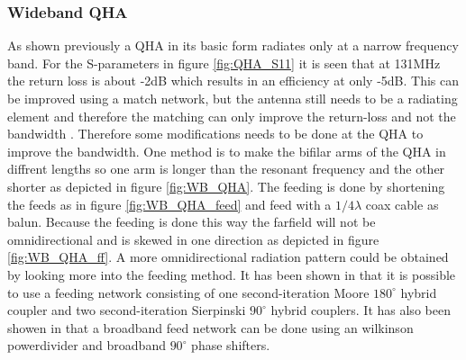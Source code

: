 \subsubsection{Wideband QHA} 
As shown previously a QHA in its basic form radiates only at a narrow frequency band. For the S-parameters in figure \ref{fig:QHA_S11} it is seen that at 131MHz the return loss is about -2dB which results in an efficiency at only -5dB. This can be improved using a match network, but the antenna still needs to be a radiating element and therefore the matching can only improve the return-loss and not the bandwidth \citep{Iyver2010}. Therefore some modifications needs to be done at the QHA to improve the bandwidth. One method is to make the bifilar arms of the QHA in diffrent lengths so one arm is longer than the resonant frequency and the other shorter as depicted in figure \ref{fig:WB_QHA}. The feeding is done by shortening the feeds as in figure \ref{fig:WB_QHA_feed} and feed with a $1/4\lambda$ coax cable as balun. Because the feeding is done this way the farfield will not be omnidirectional and is skewed in one direction as depicted in figure \ref{fig:WB_QHA_ff}. A more omnidirectional radiation pattern could be obtained by looking more into the feeding method. It has been shown in \citep{Bai2014} that it is possible to use a feeding network consisting of one second-iteration Moore $180^\circ$ hybrid coupler and two second-iteration Sierpinski $90^\circ$ hybrid couplers. It has also been showen in \citep{Yang2014} that a broadband feed network can be done using an wilkinson powerdivider and broadband $90^\circ$ phase shifters.       


